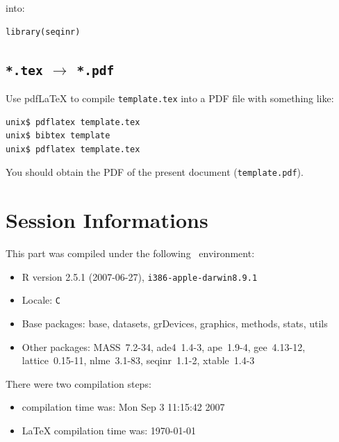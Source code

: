 \documentclass{article}
\begin{document}
into:

\begin{verbatim}
library(seqinr)
\end{verbatim}

\subsection{\texttt{*.tex} $\rightarrow$ \texttt{*.pdf}}

Use pdf\LaTeX{} to compile \texttt{template.tex} into a PDF file
with something like:

\begin{verbatim}
unix$ pdflatex template.tex
unix$ bibtex template
unix$ pdflatex template.tex
\end{verbatim}

You should obtain the PDF of the present document (\texttt{template.pdf}).



\section{Session Informations}

This part was compiled under the following \Rlogo{}~environment:

\begin{itemize}
  \item R version 2.5.1 (2007-06-27), \verb|i386-apple-darwin8.9.1|
  \item Locale: \verb|C|
  \item Base packages: base, datasets, grDevices, graphics, methods,
    stats, utils
  \item Other packages: MASS~7.2-34, ade4~1.4-3, ape~1.9-4,
    gee~4.13-12, lattice~0.15-11, nlme~3.1-83, seqinr~1.1-2,
    xtable~1.4-3
\end{itemize}
There were two compilation steps:

\begin{itemize}
  \item \Rlogo{} compilation time was: Mon Sep  3 11:15:42 2007
  \item \LaTeX{} compilation time was: \today
\end{itemize}


\clearpage
{}


\end{document}
